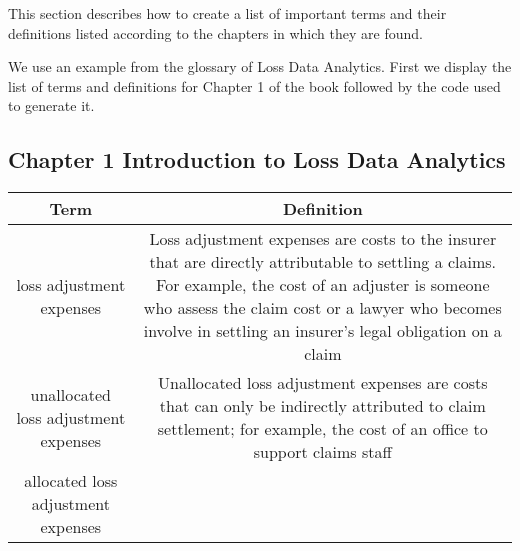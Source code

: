 \documentclass[
]{book}
\begin{document}
This section describes how to create a list of important terms and their definitions listed according to the chapters in which they are found.

We use an example from the glossary of Loss Data Analytics. First we display the list of terms and definitions for Chapter 1 of the book followed by the code used to generate it.

\hypertarget{chapter-1-introduction-to-loss-data-analytics}{%
\subsection{Chapter 1 Introduction to Loss Data Analytics}\label{chapter-1-introduction-to-loss-data-analytics}}

\begin{longtable}[]{@{}cc@{}}
\toprule
\begin{minipage}[b]{0.39\columnwidth}\centering
Term\strut
\end{minipage} & \begin{minipage}[b]{0.43\columnwidth}\centering
Definition\strut
\end{minipage}\tabularnewline
\midrule
\endhead
\begin{minipage}[t]{0.39\columnwidth}\centering
loss adjustment expenses\strut
\end{minipage} & \begin{minipage}[t]{0.43\columnwidth}\centering
Loss adjustment expenses are
costs to the insurer that are
directly attributable to
settling a claims. For
example, the cost of an
adjuster is someone who assess
the claim cost or a lawyer who
becomes involve in settling an
insurer's legal obligation on
a claim\strut
\end{minipage}\tabularnewline
\begin{minipage}[t]{0.39\columnwidth}\centering
unallocated loss adjustment
expenses\strut
\end{minipage} & \begin{minipage}[t]{0.43\columnwidth}\centering
Unallocated loss adjustment
expenses are costs that can
only be indirectly attributed
to claim settlement; for
example, the cost of an office
to support claims staff\strut
\end{minipage}\tabularnewline
\begin{minipage}[t]{0.39\columnwidth}\centering
allocated loss adjustment
expenses\strut
\end{minipage} & \begin{minipage}[t]{0.43\columnwidth}\centering

\end{minipage}
\end{longtable}
\end{document}
